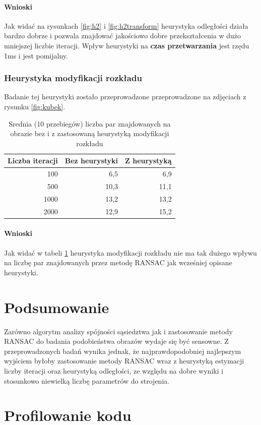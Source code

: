 \documentclass{article}
\begin{document}
	\paragraph{Wnioski}
	Jak widać na rysunkach \ref{fig:h2} i \ref{fig:h2transform} heurystyka odległości działa bardzo dobrze i pozwala znajdować jakościowo dobre przekształcenia w dużo mniejszej liczbie iteracji.
	Wpływ heurystyki na \textbf{czas przetwarzania} jest rzędu 1ms i jest pomijalny.
	
	\subsubsection{Heurystyka modyfikacji rozkładu}
	Badanie tej heurystyki zostało przeprowadzone przeprowadzone na zdjęciach z rysunku \ref{fig:kubek}.
	\begin{table}[H]
		\centering
		\caption{Srednia (10 przebiegów) liczba par znajdowanych na obrazie bez i z zastosowaną heurystyką modyfikacji rozkładu}
		\label{tab:h3}
		\begin{tabular}{|r|r|r|}
			\hline
			\multicolumn{1}{|l|}{\textbf{Liczba iteracji}} & \multicolumn{1}{l|}{\textbf{Bez heurystyki}} & \multicolumn{1}{l|}{\textbf{Z heurystyką}} \\ \hline
			100                                            & 6,5                                          & 6,9                                        \\ \hline
			500                                            & 10,3                                         & 11,1                                       \\ \hline
			1000                                           & 13,2                                         & 13,2                                       \\ \hline
			2000                                           & 12,9                                         & 15,2                                       \\ \hline
		\end{tabular}
	\end{table}
	\paragraph{Wnioski}
	Jak widać w tabeli \ref{tab:h3} heurystyka modyfikacji rozkładu nie ma tak dużego wpływu na liczbę par znajdowanych przez metodę RANSAC jak wcześniej opisane heurystyki.
	\section{Podsumowanie}
	Zarówno algorytm analizy spójności sąsiedztwa jak i zastosowanie metody RANSAC do badania podobieństwa obrazów wydaje się być sensowne. Z przeprowadzonych badań wynika jednak, że najprawdopodobniej najlepszym wyjściem byłoby zastosowanie metody RANSAC wraz z heurystyką estymacji liczby iteracji oraz heurystyką odległości, ze względu na dobre wyniki i stosunkowo niewielką liczbę parametrów do strojenia.
	\section{Profilowanie kodu}
\end{document}
